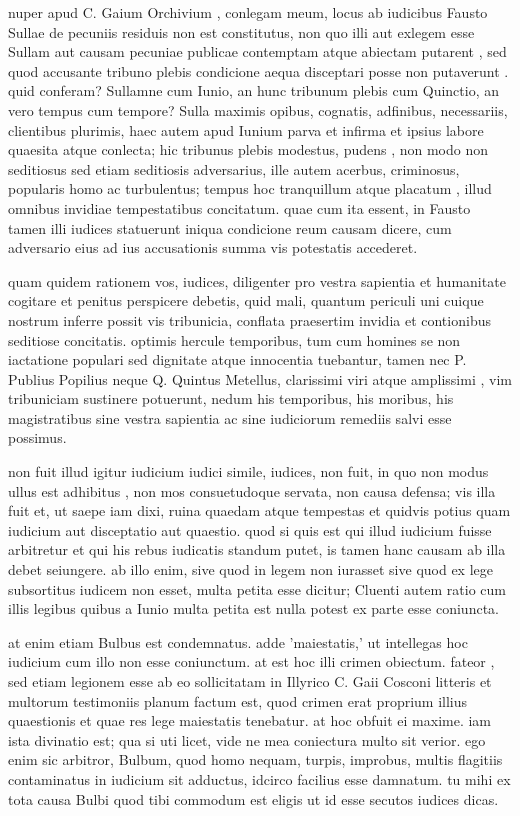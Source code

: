  nuper apud C. Gaium Orchivium , conlegam meum, locus ab iudicibus Fausto Sullae de pecuniis residuis non est constitutus, non quo illi aut exlegem esse Sullam aut causam pecuniae publicae contemptam atque abiectam putarent , sed quod accusante tribuno plebis condicione aequa disceptari posse non putaverunt . quid conferam? Sullamne cum Iunio, an hunc tribunum plebis cum Quinctio, an vero tempus cum tempore? Sulla maximis opibus, cognatis, adfinibus, necessariis, clientibus plurimis, haec autem apud Iunium parva et infirma et ipsius labore quaesita atque conlecta; hic tribunus plebis modestus, pudens , non modo non seditiosus sed etiam seditiosis adversarius, ille autem acerbus, criminosus, popularis homo ac turbulentus; tempus hoc tranquillum atque placatum , illud omnibus invidiae tempestatibus concitatum. quae cum ita essent, in Fausto tamen illi iudices statuerunt iniqua condicione reum causam dicere, cum adversario eius ad ius accusationis summa vis potestatis accederet.

 quam quidem rationem vos, iudices, diligenter pro vestra sapientia et humanitate cogitare et penitus perspicere debetis, quid mali, quantum periculi uni cuique nostrum inferre possit vis tribunicia, conflata praesertim invidia et contionibus seditiose concitatis. optimis hercule temporibus, tum cum homines se non iactatione populari sed dignitate atque innocentia tuebantur, tamen nec P. Publius Popilius neque Q. Quintus Metellus, clarissimi viri atque amplissimi , vim tribuniciam sustinere potuerunt, nedum his temporibus, his moribus, his magistratibus sine vestra sapientia ac sine iudiciorum remediis salvi esse possimus.

 non fuit illud igitur iudicium iudici simile, iudices, non fuit, in quo non modus ullus est adhibitus , non mos consuetudoque servata, non causa defensa; vis illa fuit et, ut saepe iam dixi, ruina quaedam atque tempestas et quidvis potius quam iudicium aut disceptatio aut quaestio. quod si quis est qui illud iudicium fuisse arbitretur et qui his rebus iudicatis standum putet, is tamen hanc causam ab illa debet seiungere. ab illo enim, sive quod in legem non iurasset sive quod ex lege subsortitus iudicem non esset, multa petita esse dicitur; Cluenti autem ratio cum illis legibus quibus a Iunio multa petita est nulla potest ex parte esse coniuncta.

 at enim etiam Bulbus est condemnatus. adde 'maiestatis,' ut intellegas hoc iudicium cum illo non esse coniunctum. at est hoc illi crimen obiectum. fateor , sed etiam legionem esse ab eo sollicitatam in Illyrico C. Gaii Cosconi litteris et multorum testimoniis planum factum est, quod crimen erat proprium illius quaestionis et quae res lege maiestatis tenebatur. at hoc obfuit ei maxime. iam ista divinatio est; qua si uti licet, vide ne mea coniectura multo sit verior. ego enim sic arbitror, Bulbum, quod homo nequam, turpis, improbus, multis flagitiis contaminatus in iudicium sit adductus, idcirco facilius esse damnatum. tu mihi ex tota causa Bulbi quod tibi commodum est eligis ut id esse secutos iudices dicas.

